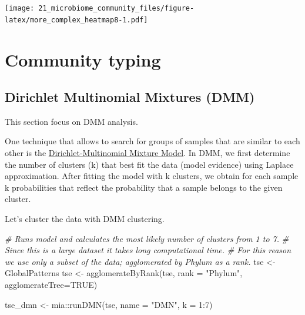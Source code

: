\documentclass[
]{book}
\newenvironment{Shaded}{\begin{snugshade}}{\end{snugshade}}
\newcommand{\AttributeTok}[1]{\textcolor[rgb]{0.77,0.63,0.00}{#1}}
\newcommand{\CommentTok}[1]{\textcolor[rgb]{0.56,0.35,0.01}{\textit{#1}}}
\newcommand{\ConstantTok}[1]{\textcolor[rgb]{0.00,0.00,0.00}{#1}}
\newcommand{\DecValTok}[1]{\textcolor[rgb]{0.00,0.00,0.81}{#1}}
\newcommand{\FunctionTok}[1]{\textcolor[rgb]{0.00,0.00,0.00}{#1}}
\newcommand{\NormalTok}[1]{#1}
\newcommand{\OtherTok}[1]{\textcolor[rgb]{0.56,0.35,0.01}{#1}}
\newcommand{\SpecialCharTok}[1]{\textcolor[rgb]{0.00,0.00,0.00}{#1}}
\newcommand{\StringTok}[1]{\textcolor[rgb]{0.31,0.60,0.02}{#1}}
\begin{document}
\texttt{[image: 21\_microbiome\_community\_files/figure-latex/more\_complex\_heatmap8-1.pdf]}

\hypertarget{community-typing}{%
\chapter{Community typing}\label{community-typing}}

\hypertarget{dirichlet-multinomial-mixtures-dmm}{%
\section{Dirichlet Multinomial Mixtures (DMM)}\label{dirichlet-multinomial-mixtures-dmm}}

This section focus on DMM analysis.

One technique that allows to search for groups of samples that are
similar to each other is the \href{https://journals.plos.org/plosone/article?id=10.1371/journal.pone.0030126}{Dirichlet-Multinomial Mixture
Model}. In
DMM, we first determine the number of clusters (k) that best fit the
data (model evidence) using Laplace approximation. After fitting the
model with k clusters, we obtain for each sample k probabilities that
reflect the probability that a sample belongs to the given cluster.

Let's cluster the data with DMM clustering.

\begin{Shaded}
\begin{Highlighting}[]
\CommentTok{\# Runs model and calculates the most likely number of clusters from 1 to 7.}
\CommentTok{\# Since this is a large dataset it takes long computational time.}
\CommentTok{\# For this reason we use only a subset of the data; agglomerated by Phylum as a rank.}
\NormalTok{tse }\OtherTok{\textless{}{-}}\NormalTok{ GlobalPatterns}
\NormalTok{tse }\OtherTok{\textless{}{-}} \FunctionTok{agglomerateByRank}\NormalTok{(tse, }\AttributeTok{rank =} \StringTok{"Phylum"}\NormalTok{, }\AttributeTok{agglomerateTree=}\ConstantTok{TRUE}\NormalTok{)}
\end{Highlighting}
\end{Shaded}

\begin{Shaded}
\begin{Highlighting}[]
\NormalTok{tse\_dmn }\OtherTok{\textless{}{-}}\NormalTok{ mia}\SpecialCharTok{::}\FunctionTok{runDMN}\NormalTok{(tse, }\AttributeTok{name =} \StringTok{"DMN"}\NormalTok{, }\AttributeTok{k =} \DecValTok{1}\SpecialCharTok{:}\DecValTok{7}\NormalTok{)}
\end{Highlighting}
\end{Shaded}
\end{document}
